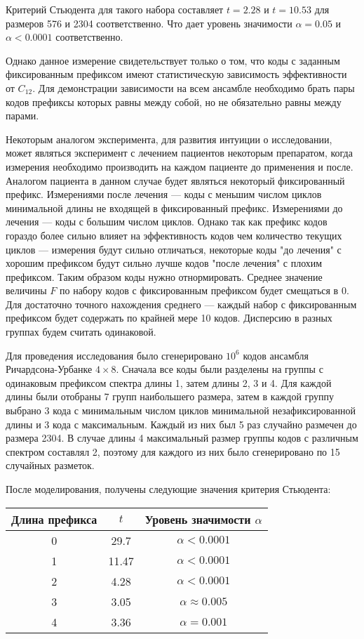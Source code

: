 Критерий Стьюдента для такого набора составляет $t=2.28$ и $t=10.53$ для размеров 576 и 2304 соответственно.
Что дает уровень значимости $\alpha=0.05$ и $\alpha<0.0001$ соответственно.

Однако данное измерение свидетельствует только о том, что коды с заданным фиксированным префиксом
 имеют статистическую зависимость эффективности от $C_{12}$. Для демонстрации зависимости на всем
 ансамбле необходимо брать пары кодов префиксы которых равны между собой, но не обязательно равны
 между парами. 
 
 Некоторым аналогом эксперимента, для развития интуиции о исследовании, может являться эксперимент
 с лечением пациентов некоторым препаратом, когда измерения необходимо производить на каждом пациенте
 до применения и после. Аналогом пациента в данном случае будет являться некоторый фиксированный префикс.
 Измерениями после лечения --- коды с меньшим числом циклов минимальной длины не входящей в фиксированный
 префикс. Измерениями до лечения --- коды с большим числом циклов. Однако так как префикс кодов
 гораздо более сильно влияет на эффективность кодов чем количество текущих циклов --- измерения будут
 сильно отличаться, некоторые коды "до лечения" с хорошим префиксом будут сильно лучше кодов
 "после лечения" с плохим префиксом. Таким образом коды нужно отнормировать. Среднее значение
 величины $F$ по набору кодов с фиксированным префиксом будет смещаться в 0. Для достаточно точного
 нахождения среднего --- каждый набор с фиксированным префиксом будет содержать по крайней мере 10
 кодов. Дисперсию в разных группах будем считать одинаковой.
 
 Для проведения исследования было сгенерировано $10^6$ кодов ансамбля Ричардсона-Урбанке $4 \times 8$.
 Сначала все коды были разделены на группы с одинаковым префиксом спектра длины 1, затем длины 2, 3 и 4.
 Для каждой длины были отобраны 7 групп наибольшего размера, затем в каждой группу выбрано 3 кода с минимальным
 числом циклов минимальной незафиксированной длины и 3 кода с максимальным. Каждый из них
 был 5 раз случайно размечен до размера 2304. В случае длины 4 максимальный размер группы кодов 
 с различным спектром составлял 2, поэтому для каждого из них было сгенерировано по 15 случайных разметок. 

После моделирования, получены следующие значения критерия Стьюдента:

\begin{tabular}{|c|c|c|}
	\hline
	Длина префикса & $t$ & Уровень значимости $\alpha$\\
	\hline
	0 & 29.7 &  $\alpha < 0.0001$\\
	\hline
	1 & 11.47 &  $\alpha < 0.0001$\\
	\hline
	2 & 4.28 & $\alpha < 0.0001$ \\
	\hline
	3 & 3.05 & $\alpha \approx 0.005$ \\
	\hline
	4 & 3.36 & $\alpha = 0.001$ \\
	\hline
\end{tabular}

